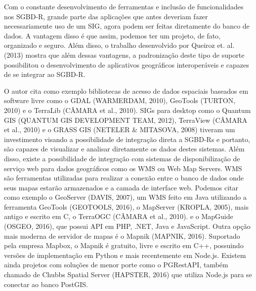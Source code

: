 		Com o constante desenvolvimento de ferramentas e inclusão de funcionalidades nos SGBD-R, grande parte das aplicações que antes deveriam fazer necessariamente uso de um SIG, agora podem ser feitas diretamente do banco de dados. A vantagem disso é que assim, podemos ter um projeto, de fato, organizado e seguro. Além disso, o trabalho desenvolvido por Queiroz et. al. (2013)\cite{QUEIROZ_etal13} mostra que além dessas vantagens, a padronização deste tipo de suporte possibilitou o desenvolvimento de aplicativos geográficos interoperáveis e capazes de se integrar ao SGBD-R.
		
		O autor cita como exemplo bibliotecas de acesso de dados espaciais baseados em software livre como o GDAL (WARMERDAM, 2010)\cite{WARMERDAM}, GeoTools (TURTON, 2010)\cite{TURTON} e o TerraLib (CÂMARA et al., 2010)\cite{CAMARA_etal10}. SIGs para desktop como o Quantum GIS (QUANTUM GIS DEVELOPMENT TEAM, 2012)\cite{QGIS}, TerraView (CÂMARA et al., 2010)\cite{CAMARA_etal10} e o GRASS GIS (NETELER \& MITASOVA, 2008)\cite{NETELER_MITASOVA} tiveram um investimento visando a possibilidade de integração direta a SGBD-Rs e portanto, são capazes de visualizar e analisar diretamente os dados destes sistemas. Além disso, existe a possibilidade de integração com sistemas de disponibilização de serviço web para dados geográficos como os WMS ou Web Map Servers. WMS são ferramentas utilizadas para realizar a conexão entre o banco de dados onde seus mapas estarão armazenados e a camada de interface web. Podemos citar como exemplo o GeoServer (DAVIS, 2007)\cite{DAVIS_07}, um WMS feito em Java utilizando a ferramenta GeoTools (GEOTOOLS, 2016), o MapServer (KROPLA, 2005)\cite{KROPLA}, mais antigo e escrito em C, o TerraOGC (CÂMARA et al., 2010)\cite{CAMARA_etal10}. e o MapGuide (OSGEO, 2016), que possui API em PHP, .NET, Java e JavaScript. Outra opção mais moderna de servidor de mapas é o Mapnik (MAPNIK, 2016)\cite{MAPBOX_JS}. Suportado pela empresa Mapbox, o Mapnik é gratuito, livre e escrito em C++, possuindo versões de implementação em Python e mais recentemente em Node.js. Existem ainda projetos com soluções de menor porte como o PGRestAPI, também chamado de Chubbs Spatial Server (HAPSTER, 2016)\cite{HAPSTER} que utiliza Node.js para se conectar ao banco PostGIS.
		
